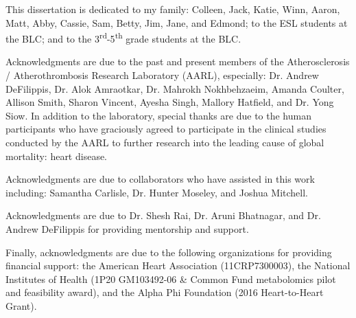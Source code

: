 \documentclass[final]{ulthesis}
\begin{document}
\begin{dedication}
This dissertation is dedicated to my family: Colleen, Jack, Katie, Winn, Aaron, Matt, Abby, Cassie, Sam, Betty, Jim, Jane, and Edmond; to the ESL students at the BLC; and to the 3\textsuperscript{rd}-5\textsuperscript{th} grade students at the BLC.
\end{dedication}

\begin{acknowledgments}
Acknowledgments are due to the past and present members of the Atherosclerosis / Atherothrombosis Research Laboratory (AARL), especially: Dr. Andrew DeFilippis, Dr. Alok Amraotkar, Dr. Mahrokh Nokhbehzaeim, Amanda Coulter, Allison Smith, Sharon Vincent, Ayesha Singh, Mallory Hatfield, and Dr. Yong Siow. In addition to the laboratory, special thanks are due to the human participants who have graciously agreed to participate in the clinical studies conducted by the AARL to further research into the leading cause of global mortality: heart disease.

Acknowledgments are due to collaborators who have assisted in this work including: Samantha Carlisle, Dr. Hunter Moseley, and Joshua Mitchell.

Acknowledgments are due to Dr. Shesh Rai, Dr. Aruni Bhatnagar, and Dr. Andrew DeFilippis for providing mentorship and support. 

Finally, acknowledgments are due to the following organizations for providing financial support: the American Heart Association (11CRP7300003), the National Institutes of Health
(1P20 GM103492-06 \& Common Fund metabolomics pilot and feasibility award), and the Alpha Phi Foundation (2016 Heart-to-Heart Grant).
\end{acknowledgments}
\end{document}
